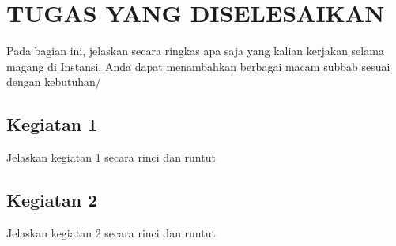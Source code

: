\chapter{TUGAS YANG DISELESAIKAN}

Pada bagian ini, jelaskan secara ringkas apa saja yang kalian kerjakan selama magang di Instansi. Anda dapat menambahkan berbagai macam subbab sesuai dengan kebutuhan/

\section{Kegiatan 1}
Jelaskan kegiatan 1 secara rinci dan runtut

\section{Kegiatan 2}
Jelaskan kegiatan 2 secara rinci dan runtut

